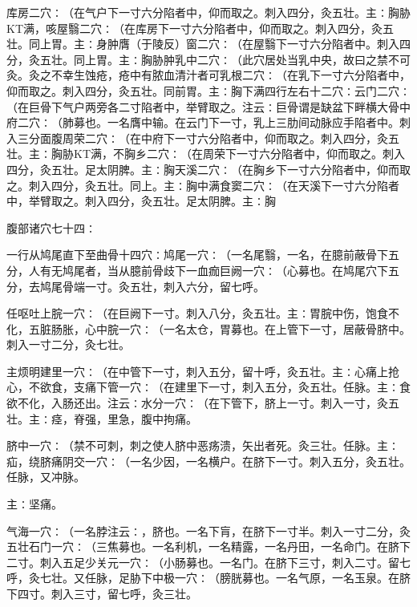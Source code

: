 \documentclass[a4paper,12pt,UTF8,twoside]{ctexbook}
\begin{document}
库房二穴∶（在气户下一寸六分陷者中，仰而取之。刺入四分，灸五壮。主∶胸胁KT满，咳屋翳二穴∶（在库房下一寸六分陷者中，仰而取之。刺入四分，灸五壮。同上胃。主∶身肿膺（于陵反）窗二穴∶（在屋翳下一寸六分陷者中。刺入四分，灸五壮。同上胃。主∶胸胁肿乳中二穴∶（此穴居处当乳中央，故曰之禁不可灸。灸之不幸生蚀疮，疮中有脓血清汁者可乳根二穴∶（在乳下一寸六分陷者中，仰而取之。刺入四分，灸五壮。同前胃。主∶胸下满四行左右十二穴∶云门二穴∶（在巨骨下气户两旁各二寸陷者中，举臂取之。注云∶巨骨谓是缺盆下畔横大骨中府二穴∶（肺募也。一名膺中输。在云门下一寸，乳上三肋间动脉应手陷者中。刺入三分面腹周荣二穴∶（在中府下一寸六分陷者中，仰而取之。刺入四分，灸五壮。主∶胸胁KT满，不胸乡二穴∶（在周荣下一寸六分陷者中，仰而取之。刺入四分，灸五壮。足太阴脾。主∶胸天溪二穴∶（在胸乡下一寸六分陷者中，仰而取之。刺入四分，灸五壮。同上。主∶胸中满食窦二穴∶（在天溪下一寸六分陷者中，举臂取之。刺入四分，灸五壮。足太阴脾。主∶胸

腹部诸穴七十四∶

一行从鸠尾直下至曲骨十四穴∶鸠尾一穴∶（一名尾翳，一名，在臆前蔽骨下五分，人有无鸠尾者，当从臆前骨歧下一血痂巨阙一穴∶（心募也。在鸠尾穴下五分，去鸠尾骨端一寸。灸五壮，刺入六分，留七呼。

任呕吐上脘一穴∶（在巨阙下一寸。刺入八分，灸五壮。主∶胃脘中伤，饱食不化，五脏肠胀，心中脘一穴∶（一名太仓，胃募也。在上管下一寸，居蔽骨脐中。刺入一寸二分，灸七壮。

主烦明建里一穴∶（在中管下一寸，刺入五分，留十呼，灸五壮。主∶心痛上抢心，不欲食，支痛下管一穴∶（在建里下一寸，刺入五分，灸五壮。任脉。主∶食欲不化，入肠还出。注云∶水分一穴∶（在下管下，脐上一寸。刺入一寸，灸五壮。主∶痉，脊强，里急，腹中拘痛。

脐中一穴∶（禁不可刺，刺之使人脐中恶疡溃，矢出者死。灸三壮。任脉。主∶疝，绕脐痛阴交一穴∶（一名少因，一名横户。在脐下一寸。刺入五分，灸五壮。任脉，又冲脉。

主∶坚痛。

气海一穴∶（一名脖注云∶，脐也。一名下肓，在脐下一寸半。刺入一寸二分，灸五壮石门一穴∶（三焦募也。一名利机，一名精露，一名丹田，一名命门。在脐下二寸。刺入五足少关元一穴∶（小肠募也。一名门。在脐下三寸，刺入二寸。留七呼，灸七壮。又任脉，足胁下中极一穴∶（膀胱募也。一名气原，一名玉泉。在脐下四寸。刺入三寸，留七呼，灸三壮。
\end{document}
